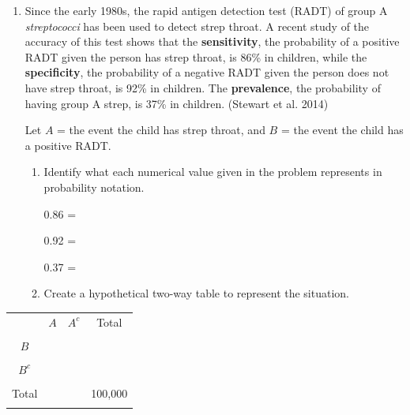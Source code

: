 \documentclass[
]{report}
\begin{document}
\begin{enumerate}
\def\labelenumi{\arabic{enumi}.}
\setcounter{enumi}{1}
\item
  Since the early 1980s, the rapid antigen detection test (RADT) of group A \emph{streptococci} has been used to detect strep throat. A recent study of the accuracy of this test shows that the \textbf{sensitivity}, the probability of a positive RADT given the person has strep throat, is 86\% in children, while the \textbf{specificity}, the probability of a negative RADT given the person does not have strep throat, is 92\% in children. The \textbf{prevalence}, the probability of having group A strep, is 37\% in children. (Stewart et al. 2014)
  \vspace{1mm}

  Let \(A\) = the event the child has strep throat, and \(B\) = the event the child has a positive RADT.
  \vspace{0.1in}

  \begin{enumerate}
  \def\labelenumii{\alph{enumii}.}
  \item
    Identify what each numerical value given in the problem represents in probability notation.
    \vspace{.1in}

    0.86 =\\
    \vspace{.1in}

    0.92 =\\
    \vspace{.1in}

    0.37 =\\
    \vspace{.1in}
  \item
    Create a hypothetical two-way table to represent the situation.
  \end{enumerate}
\end{enumerate}

\begin{center}
\begin{tabular}{|c|c|c|c|} \hline
\hspace{0.8in} & \hspace{0.35in} $A$ \hspace{.35in} & \hspace{0.35in} $A^c$  \hspace{0.35in} & \hspace{0.3in} Total \hspace{0.3in} \\ 
& & & \\ \hline
$B$& & & \\ 
& & & \\ \hline
$B^c$& & & \\ 
& & & \\ \hline
Total & & & 100,000 \\ 
& & & \\ \hline
\end{tabular}
\end{center}
\vspace{.1in}
\end{document}
